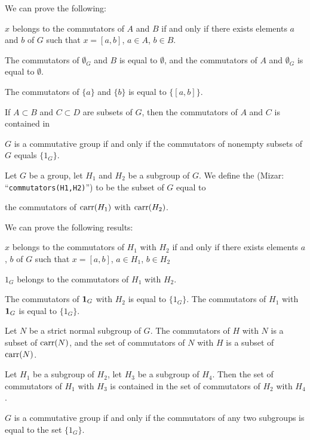 \documentclass{article}
\begin{document}
We can prove the following:
\begin{thm}
\item\label{group5:47} $x$ belongs to the commutators of $A$ and $B$ if
  and only if there exists elements $a$ and $b$ of $G$ such that
  $x=[a,b]$, $a\in A$, $b\in B$.
\item\label{group5:48} The commutators of $\emptyset_{G}$ and $B$ is
  equal to $\emptyset$, and the commutators of $A$ and $\emptyset_{G}$
  is equal to $\emptyset$.
\item\label{group5:49} The commutators of $\{a\}$ and $\{b\}$ is equal
  to $\{[a,b]\}$.
\item\label{group5:50} If $A\subset B$ and $C\subset D$ are subsets of $G$,
  then the commutators of $A$ and $C$ is contained in 
\item\label{group5:51} $G$ is a commutative group if and only if the
  commutators of nonempty subsets of $G$ equals $\{1_{G}\}$.
\end{thm}

\begin{definition}
Let $G$ be a group, let $H_{1}$ and $H_{2}$ be a subgroup of $G$.
We define the  (Mizar: ``\verb#commutators(H1,H2)#'')
to be the subset of $G$ equal to
\begin{defn}
\item the commutators of $\operatorname{carr}(H_{1})$ with $\operatorname{carr}(H_{2})$.
\end{defn}
\end{definition}

We can prove the following results:
\begin{thm}
\item\label{group5:52} $x$ belongs to the commutators of $H_{1}$ with
  $H_{2}$ if and only if there exists elements $a$, $b$ of $G$ such that
  $x=[a,b]$, $a\in H_{1}$, $b\in H_{2}$
\item\label{group5:53} $1_{G}$ belongs to the commutators of $H_{1}$
  with $H_{2}$.
\item\label{group5:54} The commutators of $\mathbf{1}_{G}$ with
  $H_{2}$ is equal to $\{1_{G}\}$. The commutators of $H_{1}$ with
  $\mathbf{1}_{G}$ is equal to $\{1_{G}\}$.
\item\label{group5:55} Let $N$ be a strict normal subgroup of $G$.
  The commutators of $H$ with $N$ is a subset of $\operatorname{carr}(N)$, and the set
  of commutators of $N$ with $H$ is a subset of $\operatorname{carr}(N)$.
\item\label{group5:56} Let $H_{1}$ be a subgroup of $H_{2}$,
  let $H_{3}$ be a subgroup of $H_{4}$.
  Then the set of commutators of $H_{1}$ with $H_{3}$ is contained in
  the set of commutators of $H_{2}$ with $H_{4}$.
\item\label{group5:57} $G$ is a commutative group if and only if the
  commutators of any two subgroups is equal to the set $\{1_{G}\}$.
\end{thm}
\end{document}
